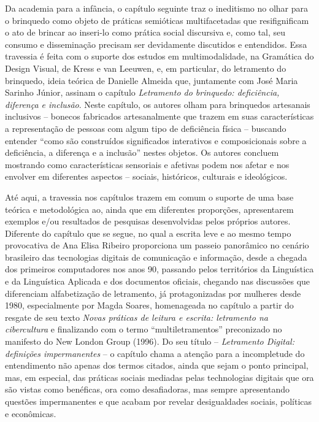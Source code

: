 \documentclass[portuguese]{textolivre}
\begin{document}
Da academia para a infância, o capítulo seguinte traz o ineditismo no olhar para o brinquedo   como objeto de práticas semióticas multifacetadas que resifignificam o ato de brincar ao inseri-lo como prática social discursiva e, como tal, seu consumo e disseminação precisam ser devidamente discutidos e entendidos. Essa travessia é feita com o suporte dos estudos em multimodalidade, na Gramática do Design Visual, de Kress e van Leeuwen, e, em particular, do letramento do brinquedo, ideia teórica de Danielle Almeida que, juntamente com José Maria Sarinho Júnior, assinam o capítulo \textit{Letramento do brinquedo: deficiência, diferença e inclusão}. Neste capítulo, os autores olham para brinquedos artesanais inclusivos – bonecos fabricados artesanalmente que trazem em suas características a representação de pessoas com algum tipo de deficiência física – buscando entender “como são construídos significados interativos e composicionais sobre a deficiência, a diferença e a inclusão” nestes objetos. Os autores concluem mostrando como características sensoriais e afetivas podem  nos afetar e nos envolver em diferentes aspectos – sociais, históricos, culturais e ideológicos. 

Até aqui, a travessia nos capítulos trazem em comum o suporte de uma base teórica e metodológica ao, ainda que em diferentes proporções, apresentarem exemplos e/ou resultados de pesquisas desenvolvidas pelos próprios autores. Diferente do capítulo que se segue, no qual a escrita leve e ao mesmo tempo provocativa de Ana Elisa Ribeiro proporciona um passeio panorâmico no cenário brasileiro das tecnologias digitais de comunicação e informação, desde a chegada dos primeiros computadores nos anos 90, passando pelos territórios da Linguística e da Linguística Aplicada e dos documentos oficiais, chegando nas discussões que diferenciam alfabetização de letramento, já protagonizadas por mulheres desde 1980, especialmente por Magda Soares, homenageada no capítulo a partir do resgate de seu texto \textit{Novas práticas de leitura e escrita: letramento na cibercultura} \cite{soares2002cibercultura} e finalizando com o termo  “multiletramentos” preconizado no manifesto do New London Group (1996). Do seu título – \textit{Letramento Digital: definições impermanentes} – o capítulo chama a atenção para a incompletude do entendimento não apenas dos termos citados, ainda que sejam o ponto principal, mas, em especial, das práticas sociais mediadas pelas technologias digitais que ora são vistas como benéficas, ora como desafiadoras, mas sempre apresentando questões impermanentes e que acabam por revelar desigualdades sociais, políticas e econômicas.  
\end{document}
